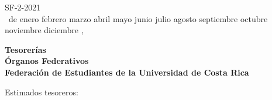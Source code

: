 \documentclass[12pt]{article}
\newcommand{\MONTH}{%
  \ifcase\the\month
  \or enero%
  \or febrero%
  \or marzo%
  \or abril%
  \or mayo%
  \or junio%
  \or julio%
  \or agosto%
  \or septiembre%
  \or octubre%
  \or noviembre%
  \or diciembre%
  \fi}
\begin{document}
\begin{flushright}
  SF-2-2021\\
  \medskip
  \the\day\ de \MONTH, \the\year
\end{flushright}
\medskip
\begin{flushleft}\begin{spacing}{1}
  \textbf{Tesorerías\\
  Órganos Federativos\\
  Federación de Estudiantes de la Universidad de Costa Rica}
\end{spacing}\end{flushleft}

\noindent Estimados tesoreros:\par
\end{document}
